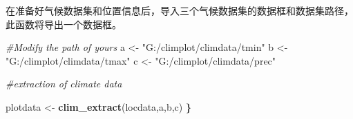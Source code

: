 \documentclass[
]{ctexart}
\newenvironment{Shaded}{\begin{snugshade}}{\end{snugshade}}
\newcommand{\CommentTok}[1]{\textcolor[rgb]{0.56,0.35,0.01}{\textit{#1}}}
\newcommand{\ErrorTok}[1]{\textcolor[rgb]{0.64,0.00,0.00}{\textbf{#1}}}
\newcommand{\FunctionTok}[1]{\textcolor[rgb]{0.13,0.29,0.53}{\textbf{#1}}}
\newcommand{\NormalTok}[1]{#1}
\newcommand{\OtherTok}[1]{\textcolor[rgb]{0.56,0.35,0.01}{#1}}
\newcommand{\StringTok}[1]{\textcolor[rgb]{0.31,0.60,0.02}{#1}}
\begin{document}
在准备好气候数据集和位置信息后，导入三个气候数据集的数据框和数据集路径，此函数将导出一个数据框。

\begin{Shaded}
\begin{Highlighting}[]
\CommentTok{\#Modify the path of yours}
\NormalTok{a }\OtherTok{\textless{}{-}} \StringTok{"G:/climplot/climdata/tmin"}
\NormalTok{b }\OtherTok{\textless{}{-}} \StringTok{"G:/climplot/climdata/tmax"}
\NormalTok{c }\OtherTok{\textless{}{-}} \StringTok{"G:/climplot/climdata/prec"}

\CommentTok{\#extraction of climate data}

\NormalTok{plotdata }\OtherTok{\textless{}{-}} \FunctionTok{clim\_extract}\NormalTok{(locdata,a,b,c)}
\ErrorTok{\}}
\end{Highlighting}
\end{Shaded}
\end{document}
